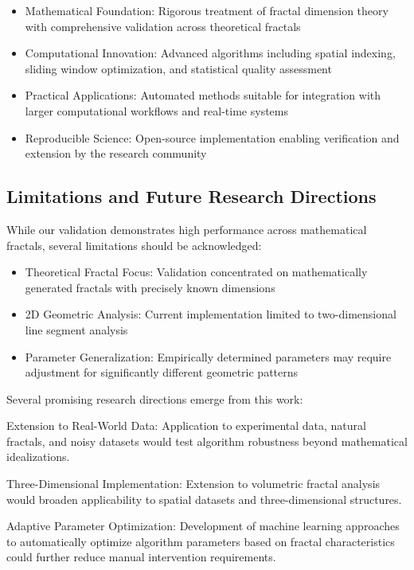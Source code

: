 \documentclass[preprint,12pt]{elsarticle}
\def\textbf#1{#1}%
\begin{document}
\begin{itemize}
\item \textbf{Mathematical Foundation}: Rigorous treatment of fractal dimension theory with comprehensive validation across theoretical fractals
\item \textbf{Computational Innovation}: Advanced algorithms including spatial indexing, sliding window optimization, and statistical quality assessment
\item \textbf{Practical Applications}: Automated methods suitable for integration with larger computational workflows and real-time systems
\item \textbf{Reproducible Science}: Open-source implementation enabling verification and extension by the research community
\end{itemize}

\subsection{Limitations and Future Research Directions}

While our validation demonstrates high performance across mathematical fractals, several limitations should be acknowledged:

\begin{itemize}
\item \textbf{Theoretical Fractal Focus}: Validation concentrated on mathematically generated fractals with precisely known dimensions
\item \textbf{2D Geometric Analysis}: Current implementation limited to two-dimensional line segment analysis
\item \textbf{Parameter Generalization}: Empirically determined parameters may require adjustment for significantly different geometric patterns
\end{itemize}

Several promising research directions emerge from this work:

\textbf{Extension to Real-World Data}: Application to experimental data, natural fractals, and noisy datasets would test algorithm robustness beyond mathematical idealizations.

\textbf{Three-Dimensional Implementation}: Extension to volumetric fractal analysis would broaden applicability to spatial datasets and three-dimensional structures.

\textbf{Adaptive Parameter Optimization}: Development of machine learning approaches to automatically optimize algorithm parameters based on fractal characteristics could further reduce manual intervention requirements.
\end{document}
